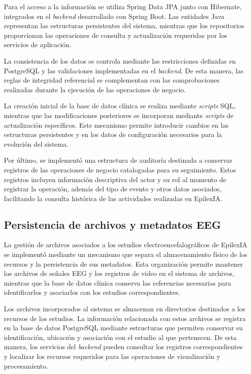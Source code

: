 Para el acceso a la información se utiliza Spring Data
JPA junto con Hibernate, integrados en el \textit{backend}
desarrollado con Spring Boot. Las entidades Java
representan las estructuras persistentes del sistema,
mientras que los repositorios proporcionan las
operaciones de consulta y actualización requeridas
por los servicios de aplicación.

La consistencia de los datos se controla mediante
las restricciones definidas en PostgreSQL y las
validaciones implementadas en el \textit{backend}. De esta
manera, las reglas de integridad referencial se
complementan con las comprobaciones realizadas
durante la ejecución de las operaciones de negocio.

La creación inicial de la base de datos clínica se
realiza mediante \textit{scripts} SQL, mientras que las
modificaciones posteriores se incorporan mediante
\textit{scripts} de actualización específicos. Este mecanismo
permite introducir cambios en las estructuras
persistentes y en los datos de configuración
necesarios para la evolución del sistema.

Por último, se implementó una estructura de auditoría
destinada a conservar registros de las operaciones
de negocio catalogadas para su seguimiento. Estos
registros incluyen información descriptiva del
actor y su rol al momento de registrar la operación,
además del tipo de evento y otros datos asociados,
facilitando la consulta histórica de las actividades
realizadas en EpilexIA.


\subsection{Persistencia de archivos y metadatos EEG}

La gestión de archivos asociados a los estudios
electroencefalográficos de EpilexIA se implementó
mediante un mecanismo que separa el almacenamiento
físico de los recursos y la persistencia de sus
metadatos. Esta organización permite mantener los
archivos de señales EEG y los registros de video
en el sistema de archivos, mientras que la base
de datos clínica conserva las referencias
necesarias para identificarlos y asociarlos con
los estudios correspondientes.

Los archivos incorporados al sistema se almacenan
en directorios destinados a los recursos de los
estudios. La información relacionada con estos
archivos se registra en la base de datos PostgreSQL
mediante estructuras que permiten conservar su
identificación, ubicación y asociación con el
estudio al que pertenecen. De esta manera, los
servicios del \textit{backend} pueden consultar los
registros correspondientes y localizar los
recursos requeridos para las operaciones de
visualización y procesamiento.

